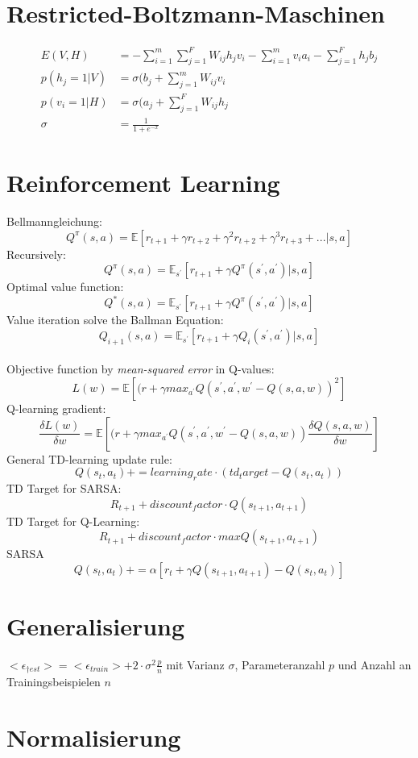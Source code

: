 \documentclass[paper=a4, fontsize=11pt]{scrartcl} %
\begin{document}
\section{Restricted-Boltzmann-Maschinen}
\begin{align*}
E(V, H) &= - \sum_{i=1}^m \sum_{j=1}^F W_{ij} h_j v_i - \sum_{i=1}^m v_i a_i - \sum_{j=1}^F h_j b_j \\
p(h_j = 1 | V) &= \sigma(b_j + \sum_{j=1}^m W_{ij}v_i \\
p(v_i = 1 | H) &= \sigma(a_j + \sum_{j=1}^F W_{ij}h_j \\
\sigma &= \frac{1}{1+e^{-x}}
\end{align*}

\section{Reinforcement Learning}
Bellmanngleichung:
\[
Q^{\pi}(s, a) = \mathbb{E}[r_{t + 1} + \gamma r_{t + 2} + \gamma^2 r_{t + 2} + \gamma^3 r_{t + 3} + ... | s, a]
\]
Recursively:
\[
Q^{\pi}(s, a) = \mathbb{E}_{s^{'}}[r_{t + 1} + \gamma Q^{\pi}(s^{'}, a^{'})| s, a]
\]
Optimal value function:
\[
Q^{*}(s, a) = \mathbb{E}_{s^{'}}[r_{t + 1} + \gamma Q^{\pi}(s^{'}, a^{'})| s, a]
\]
Value iteration solve the Ballman Equation:
\[
Q_{i + 1}(s, a) = \mathbb{E}_{s^{'}}[r_{t + 1} + \gamma Q_i(s^{'}, a^{'})| s, a]
\]
\\[1cm]
Objective function by \textit{mean-squared error} in Q-values:
\[
L(w) = \mathbb{E}[(r + \gamma max_{a^{'}}Q(s^{'}, a^{'}, w^{'} - Q(s, a, w))^2]
\]
Q-learning gradient:
\[
\frac{\delta L(w)}{\delta w} = \mathbb{E}[(r + \gamma max_{a^{'}}Q(s^{'}, a^{'}, w^{'} - Q(s, a, w)) \frac{\delta Q(s, a, w)}{\delta w}]
\]
General TD-learning update rule:
\[
Q(s_t, a_t) += learning_rate \cdot (td_target - Q(s_t, a_t))
\]
TD Target for SARSA:
\[
R_{t + 1} + discount_factor \cdot Q(s_{t + 1}, a_{t + 1})
\]
TD Target for Q-Learning:
\[
R_{t + 1} + discount_factor \cdot maxQ(s_{t + 1}, a_{t + 1})
\]
SARSA
\[
Q(s_t, a_t) += \alpha [r_t + \gamma Q(s_{t+1}, a_{t+1}) - Q(s_t, a_t)]
\]

\section{Generalisierung}

$<\epsilon_{†est}> = <\epsilon_{train}> + 2 \cdot \sigma^2 \frac{p}{n}$ mit Varianz $\sigma$, Parameteranzahl $p$ und Anzahl an Trainingsbeispielen $n$


\section{Normalisierung}
\end{document}
